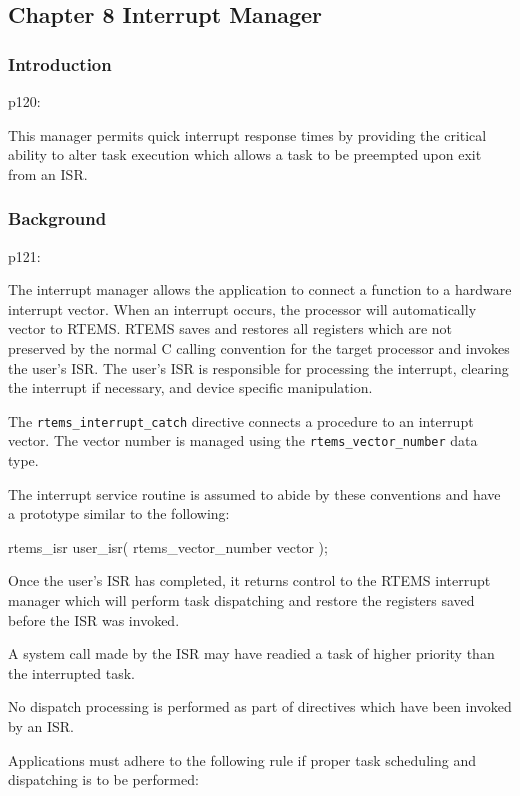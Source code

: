 \subsection{Chapter 8 Interrupt Manager}

\subsubsection{Introduction}

p120:

This manager permits quick interrupt response times by
providing the critical ability to alter task execution
which allows a task to be preempted upon exit from an ISR.

\subsubsection{Background}

p121:

The interrupt manager allows the application to connect a function
to a hardware interrupt vector.
When an interrupt occurs,
the processor will automatically vector to RTEMS.
RTEMS saves and restores all registers which are not preserved
by the normal C calling convention for the target processor
and invokes the user’s ISR.
The user’s ISR is responsible for processing the interrupt,
clearing the interrupt if necessary,
and device specific manipulation.

The \verb"rtems_interrupt_catch" directive
connects a procedure to an interrupt vector.
The vector number is managed using the \verb"rtems_vector_number" data type.

The interrupt service routine is assumed to abide by these conventions
and have a prototype similar to the following:

\begin{nicec}
rtems_isr user_isr(
  rtems_vector_number vector
);
\end{nicec}

Once the user’s ISR has completed,
it returns control to the RTEMS interrupt manager
which will perform task dispatching
and restore the registers saved before the ISR was invoked.

A system call made by the ISR may have readied a task of
higher priority than the interrupted task.

No dispatch processing is performed as part of directives
which have been invoked by an ISR.

Applications must adhere to the following rule if proper task scheduling and dispatching is to
be performed:

